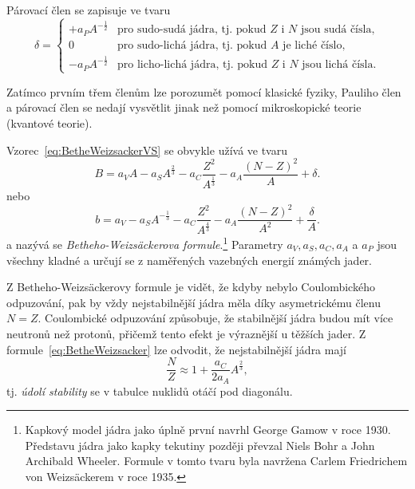 \documentclass[a4paper,12pt,oneside]{article}
\theoremstyle{red}
\begin{document}
\begin{itemize}
            Párovací člen se zapisuje ve tvaru
            \begin{equation}
                \delta=\begin{cases}
                    +a_{P}A^{-\frac{1}{2}} & \text{pro sudo-sudá jádra, tj. pokud $Z$ i $N$ jsou sudá čísla,} \\
                    0 & \text{pro sudo-lichá jádra, tj. pokud $A$ je liché číslo,} \\
                    -a_{P}A^{-\frac{1}{2}} & \text{pro licho-lichá jádra, tj. pokud $Z$ i $N$ jsou lichá čísla.}
                    \end{cases}
            \end{equation}
        \end{itemize}

    Zatímco prvním třem členům lze porozumět pomocí klasické fyziky, Pauliho člen a párovací člen se nedají vysvětlit jinak než pomocí mikroskopické teorie (kvantové teorie).

    Vzorec~\eqref{eq:BetheWeizsackerVS} se obvykle užívá ve tvaru
    \begin{equation}
        \label{eq:BetheWeizsacker}
        B=a_{V}A-a_{S}A^{\frac{2}{3}}-a_{C}\frac{Z^{2}}{A^{\frac{1}{3}}}-a_{A}\frac{\left(N-Z\right)^{2}}{A}+\delta.
    \end{equation}
    nebo
    \begin{equation}
        \label{eq:BetheWeizsackerA}
        b=a_{V}-a_{S}A^{-\frac{1}{3}}-a_{C}\frac{Z^{2}}{A^{\frac{4}{3}}}-a_{A}\frac{\left(N-Z\right)^{2}}{A^{2}}+\frac{\delta}{A}.
    \end{equation}
    a nazývá se \emph{Betheho-Weizsäckerova formule}.\footnote{Kapkový model jádra jako úplně první navrhl George Gamow v roce 1930. Představu jádra jako kapky tekutiny později převzal Niels Bohr a John Archibald Wheeler. Formule v tomto tvaru byla navržena Carlem Friedrichem von Weizsäckerem v roce 1935.}
    Parametry $a_{V},a_{S},a_{C},a_{A}$ a $a_{P}$ jsou všechny kladné a určují se z naměřených vazebných energií známých jader.

    Z Betheho-Weizsäckerovy formule je vidět, že kdyby nebylo Coulombického odpuzování, pak by vždy nejstabilnější jádra měla díky asymetrickému členu $N=Z$.        
    Coulombické odpuzování způsobuje, že stabilnější jádra budou mít více neutronů než protonů, přičemž tento efekt je výraznější u těžších jader.
    Z formule~\eqref{eq:BetheWeizsacker} lze odvodit, že nejstabilnější jádra mají 
    \begin{equation}
        \label{eq:Valley}
        \frac{N}{Z}\approx 1+\frac{a_{C}}{2a_{A}}A^{\frac{2}{3}},
    \end{equation}
    tj. \emph{údolí stability} se v tabulce nuklidů otáčí pod diagonálu.
\end{document}
